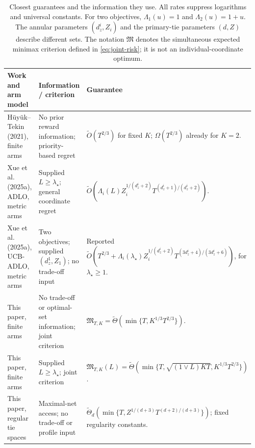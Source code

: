 \documentclass[11pt]{article}
\theoremstyle{definition}
\begin{document}
\begin{table}[t]
\centering
\small
\setlength{\tabcolsep}{5pt}
\renewcommand{\arraystretch}{1.16}
\caption{Closest guarantees and the information they use.
All rates suppress logarithms and universal constants.
For two objectives, $\Lambda_1(u)=1$ and $\Lambda_2(u)=1+u$.
The annular parameters $(d_z^i,Z_i)$ and the primary-tie parameters
$(d,Z)$ describe different sets. The notation $\mathfrak M$ denotes
the simultaneous expected minimax criterion defined in
\eqref{eq:joint-risk}; it is not an individual-coordinate optimum.}
\label{tab:related}
\begin{tabularx}{\textwidth}{@{}>{\raggedright\arraybackslash}p{3.0cm}>{\raggedright\arraybackslash}p{3.25cm}Y@{}}
\toprule
Work and arm model & Information / criterion & Guarantee \\
\midrule
H\"uy\"uk--Tekin (2021), finite arms
& No prior reward information; priority-based regret
& $\widetilde O(T^{2/3})$ for fixed $K$;
$\Omega(T^{2/3})$ already for $K=2$. \\
\addlinespace
Xue et al. (2025a), ADLO, metric arms
& Supplied $L\ge\lambda_\star$; general coordinate regret
& $\widetilde O\!\left(\Lambda_i(L)
Z_i^{1/(d_z^i+2)}T^{(d_z^i+1)/(d_z^i+2)}\right)$. \\
\addlinespace
Xue et al. (2025a), UCB-ADLO, metric arms
& Two objectives; supplied $(d_z^1,Z_1)$; no trade-off input
& Reported $\widetilde O\!\left(T^{2/3}+
\Lambda_i(\lambda_\star)Z_i^{1/(d_z^i+2)}
T^{(3d_z^i+4)/(3d_z^i+6)}\right)$, for $\lambda_\star\ge1$. \\
\addlinespace
This paper, finite arms
& No trade-off or optimal-set information; joint criterion
& $\mathfrak M_{T,K}=
\widetilde\Theta(\min\{T,K^{1/3}T^{2/3}\})$. \\
\addlinespace
This paper, finite arms
& Supplied $L\ge\lambda_\star$; joint criterion
& $\mathfrak M_{T,K}(L)=\widetilde\Theta\!\left(
\min\{T,\sqrt{(1\vee L)KT},K^{1/3}T^{2/3}\}\right)$. \\
\addlinespace
This paper, regular tie spaces
& Maximal-net access; no trade-off or profile input
& $\widetilde\Theta_d\!\left(
\min\{T,Z^{1/(d+3)}T^{(d+2)/(d+3)}\}\right)$;
fixed regularity constants. \\
\bottomrule
\end{tabularx}
\end{table}
\end{document}
